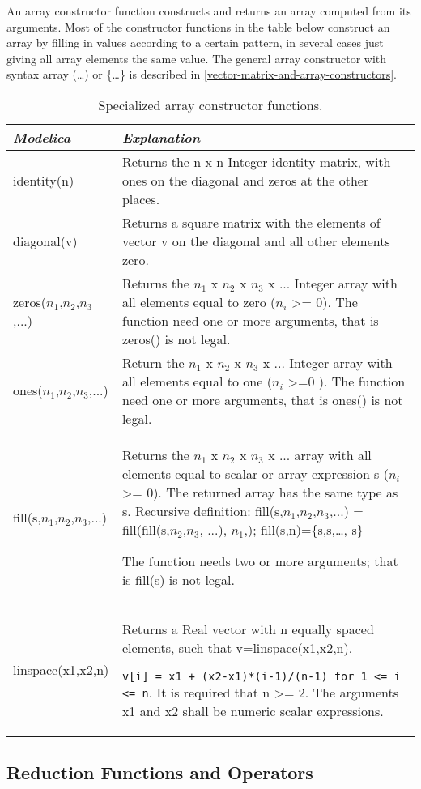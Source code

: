 An array constructor function constructs and returns an array computed
from its arguments. Most of the constructor functions in the table below
construct an array by filling in values according to a certain pattern,
in several cases just giving all array elements the same value. The
general array constructor with syntax array (\ldots{}) or \{\ldots{}\}
is described in \autoref{vector-matrix-and-array-constructors}.

\begin{longtable}[]{|l|p{11cm}|}
\caption{Specialized array constructor functions.}\\
\hline
\emph{Modelica} & \emph{Explanation}\\ \hline
\endhead
identity(n)
&
Returns the n x n Integer identity matrix, with ones on the diagonal and
zeros at the other places.\\ \hline
diagonal(v)
&
Returns a square matrix with the elements of vector v on the diagonal
and all other elements zero.\\ \hline
zeros($n_1$,$n_2$,$n_3$,...) &
Returns the $n_1$ x $n_2$ x $n_3$ x ... Integer array with all elements equal to zero ($n_i$
\textgreater{}= 0). The function need one or more arguments, that is
zeros() is not legal.\\ \hline
ones($n_1$,$n_2$,$n_3$,...) &
Return the $n_1$ x $n_2$ x $n_3$ x ... Integer array with all elements equal to one ($n_i$
\textgreater{}=0 ). The function need one or more arguments, that is
ones() is not legal.\\ \hline
fill(s,$n_1$,$n_2$,$n_3$,...) &
Returns the $n_1$ x $n_2$ x $n_3$ x ... array with all elements equal to scalar or array expression s
($n_i$ \textgreater{}= 0). The returned array has the same
type as s.
Recursive definition:
fill(s,$n_1$,$n_2$,$n_3$,...) =
fill(fill(s,$n_2$,$n_3$, ...),
$n_1$,); fill(s,n)=\{s,s,\ldots{}, s\}

The function needs two or more arguments; that is fill(s) is not
legal.\\ \hline
linspace(x1,x2,n)
&
Returns a Real vector with n equally spaced elements, such that
v=linspace(x1,x2,n),

\lstinline!v[i] = x1 + (x2-x1)*(i-1)/(n-1) for 1 <= i <= n!.
It is required that n \textgreater{}= 2. The arguments x1 and x2 shall
be numeric scalar expressions.\\ \hline
\end{longtable}

\subsection{Reduction Functions and Operators}

